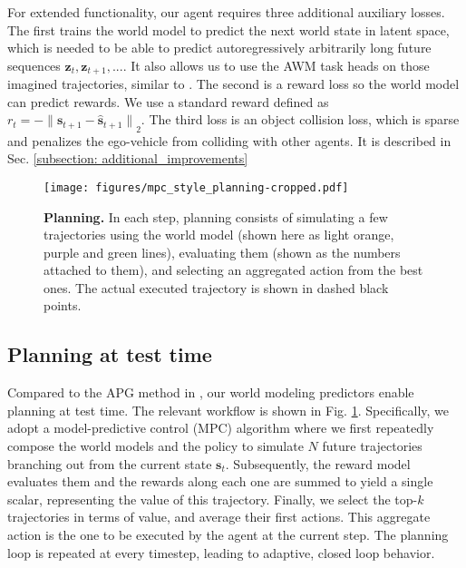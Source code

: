 For extended functionality, our agent requires three additional auxiliary losses. The first trains the world model to predict the next world state in latent space, which is needed to be able to predict autoregressively arbitrarily long future sequences $\mathbf{z}_t, \mathbf{z}_{t+1}, ...$. It also allows us to use the AWM task heads on those imagined trajectories, similar to \cite{hafner2019dream, wu2023daydreamer}. The second is a reward loss so the world model can predict rewards. We use a standard reward defined as $r_t = -{\lVert \mathbf{s}_{t+1} - \hat{\mathbf{s}}_{t+1} \rVert}_2$. The third loss is an object collision loss, which is sparse and penalizes the ego-vehicle from colliding with other agents. It is described in Sec. \ref{subsection: additional_improvements}

\begin{figure}[t!]
    \centering
    \texttt{[image: figures/mpc\_style\_planning-cropped.pdf]}
    \captionsetup{belowskip=-0.35cm, aboveskip=0.2cm}
    \caption{\textbf{Planning.} In each step, planning consists of simulating a few trajectories using the world model (shown here as light orange, purple and green lines), evaluating them (shown as the numbers attached to them), and selecting an aggregated action from the best ones. The actual executed trajectory is shown in dashed black points. }
    \label{fig: planning_high_level}
\end{figure}

\subsection{Planning at test time}
\label{subsection: planning}

Compared to the APG method in \cite{nachkov2024autonomous}, our world modeling predictors enable planning at test time. The relevant workflow is shown in Fig. \ref{fig: planning_high_level}. Specifically, we adopt a model-predictive control (MPC) algorithm where we first repeatedly compose the world models and the policy to simulate $N$ future trajectories branching out from the current state $\mathbf{s}_t$. Subsequently, the reward model evaluates them and the rewards along each one are summed to yield a single scalar, representing the value of this trajectory. Finally, we select the top-$k$ trajectories in terms of value, and average their first actions. This aggregate action is the one to be executed by the agent at the current step. The planning loop is repeated at every timestep, leading to adaptive, closed loop behavior. 

